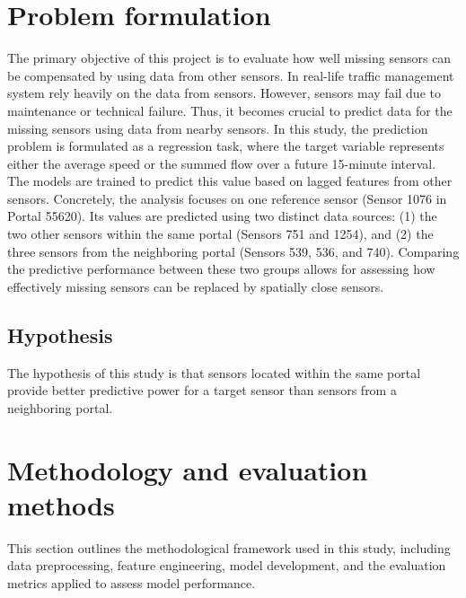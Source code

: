 	\section{Problem formulation}
	The primary objective of this project is to evaluate how well missing sensors can be compensated by using data from other sensors. \newline 
	In real-life traffic management system rely heavily on the data from sensors. However, sensors may fail due to maintenance or technical failure. Thus, it becomes crucial to predict data for the missing sensors using data from nearby sensors. \newline 
	In this study, the prediction problem is formulated as a regression task, where the target variable represents either the average speed or the summed flow over a future 15-minute interval. The models are trained to predict this value based on lagged features from other sensors.\newline 
	Concretely, the analysis focuses on one reference sensor (Sensor 1076 in Portal 55620). Its values are predicted using two distinct data sources: (1) the two other sensors within the same portal (Sensors 751 and 1254), and (2) the three sensors from the neighboring portal (Sensors 539, 536, and 740). Comparing the predictive performance between these two groups allows for assessing how effectively missing sensors can be replaced by spatially close sensors.
	\subsection{Hypothesis}
	The hypothesis of this study is that sensors located within the same portal provide better predictive power for a target sensor than sensors from a neighboring portal.

%	
	\section{Methodology and evaluation methods}
	This section outlines the methodological framework used in this study, including data preprocessing, feature engineering, model development, and the evaluation metrics applied to assess model performance.
